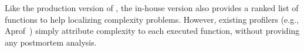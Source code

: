 Like the production version of \Tool, the in-house version also provides a 
ranked list of functions to help localizing complexity problems.
However, existing profilers (e.g., Aprof~\cite{Aprof1,Aprof2})  
simply attribute complexity to each executed function, 
without providing any postmortem analysis. 




